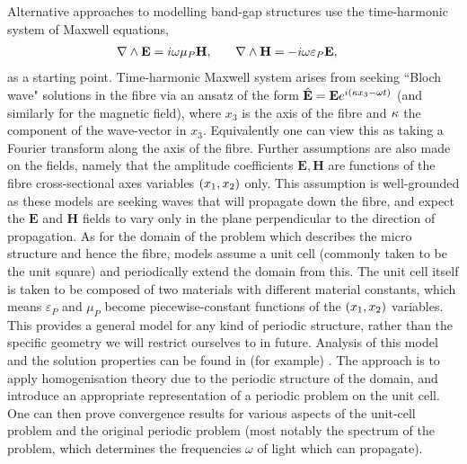 Alternative approaches to modelling band-gap structures use the time-harmonic system of Maxwell equations,
\begin{align*}
	\nabla\wedge\mathbf{E} &= i\omega\mu_{P}\mathbf{H}, &\quad \nabla\wedge\mathbf{H} &= -i\omega\varepsilon_{P}\mathbf{E},
\end{align*} 
as a starting point.
Time-harmonic Maxwell system arises from seeking ``Bloch wave" solutions in the fibre via an ansatz of the form $\hat{\mathbf{E}}=\mathbf{E}e^{i\left( \kappa x_3-\omega t \right)}$ (and similarly for the magnetic field), where $x_3$ is the axis of the fibre and $\kappa$ the component of the wave-vector in $x_3$.
Equivalently one can view this as taking a Fourier transform along the axis of the fibre.
Further assumptions are also made on the fields, namely that the amplitude coefficients $\mathbf{E},\mathbf{H}$ are functions of the fibre cross-sectional axes variables $\left( x_1,x_2 \right)$ only.
This assumption is well-grounded as these models are seeking waves that will propagate down the fibre, and expect the $\mathbf{E}$ and $\mathbf{H}$ fields to vary only in the plane perpendicular to the direction of propagation.
As for the domain of the problem which describes the micro structure and hence the fibre, models assume a unit cell (commonly taken to be the unit square) and periodically extend the domain from this.
The unit cell itself is taken to be composed of two materials with different material constants, which means $\varepsilon_{P}$ and $\mu_{P}$ become piecewise-constant functions of the $\left( x_1,x_2 \right)$ variables.
This provides a general model for any kind of periodic structure, rather than the specific geometry we will restrict ourselves to in future.
Analysis of this model and the solution properties can be found in (for example) \cite{cooper2014band}. 
The approach is to apply homogenisation theory due to the periodic structure of the domain, and introduce an appropriate representation of a periodic problem on the unit cell.
One can then prove convergence results for various aspects of the unit-cell problem and the original periodic problem (most notably the spectrum of the problem, which determines the frequencies $\omega$ of light which can propagate). \newline
{}

